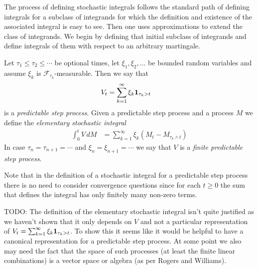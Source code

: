 The process of defining stochastic integrals follows the standard path of defining integrals for a subclass of integrands for which the definition and existence of the associated integral is easy to see.  Then one uses approximations to extend the class of integrands.  We begin by defining that initial subclass of integrands and define integrals of them with respect to an arbitrary martingale.
\begin{defn}Let $\tau_1 \leq \tau_2 \leq \dotsb$ be optional times, let $\xi_1, \xi_2, \dotsc$ be bounded random variables and assume $\xi_k$ is  $\mathcal{F}_{\tau_k}$-measurable.  Then we say that 
\begin{align*}
V_t &= \sum_{k=1}^\infty \xi_k \textbf{1}_{\tau_{k} > t}
\end{align*}
is a \emph{predictable step process}.  Given a predictable step process and a process $M$ we define the \emph{elementary stochastic integral}
\begin{align*}
\int_0^t V \, dM &= \sum_{k=1}^\infty \xi_k \left (M_t - M_{\tau_k \wedge t} \right)
\end{align*}
In case $\tau_n = \tau_{n+1} = \dotsb$ and $\xi_n = \xi_{n+1} = \dotsb$ we say that $V$ is a \emph{finite predictable step process}.
\end{defn}
Note that in the definition of a stochastic integral for a predictable step process there is no need to consider convergence questions since for each $t \geq 0$ the sum that defines the integral has only finitely many non-zero terms.

TODO: The definition of the elementary stochastic integral isn't quite justified as we haven't shown that it only depends on $V$ and not a particular representation of $V_t = \sum_{k=1}^\infty \xi_k \textbf{1}_{\tau_{k} > t}$.  To show this it seems like it would be helpful to have a canonical representation for a predictable step process.  At some point we also may need the fact that the space of such processes (at least the finite linear combinations) is a vector space or algebra (as per Rogers and Williams).

